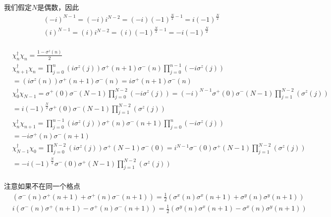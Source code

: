 我们假定$N$是偶数，因此
\begin{equation}
\begin{split}
&(-i)^{N-1} = (-i)i^{N-2} =(-i) (-1)^{\frac{N}{2}-1}=i(-1)^{\frac{N}{2}}\\
&(i)^{N-1} = (i)i^{N-2} =(i) (-1)^{\frac{N}{2}-1}=-i(-1)^{\frac{N}{2}}\\
\end{split}
\end{equation}

\begin{equation}
\begin{split}
&\chi^{\dagger}_n\chi _n = \frac{1-\sigma ^z(n)}{2}\\
&\chi^{\dagger}_{n+1}\chi _n = \prod _{j=0}^n(i\sigma ^z(j)) \sigma ^+(n+1)\sigma ^-(n)\prod _{j=0}^{n-1}(-i\sigma ^z(j))\\
&=(i\sigma ^z(n)) \sigma ^+(n+1)\sigma ^-(n)= i\sigma ^+(n+1)\sigma ^-(n)\\
&\chi^{\dagger}_{0}\chi _{N-1} = \sigma ^+(0)\sigma ^-(N-1)\prod _{j=0}^{N-2}(-i\sigma ^z(j))=(-i)^{N-1}\sigma ^+(0)\sigma ^-(N-1)\prod _{j=1}^{N-2}(\sigma ^z(j))\\
&=i(-1)^{\frac{N}{2}}\sigma ^+(0)\sigma ^-(N-1)\prod _{j=1}^{N-2}(\sigma ^z(j))\\
&\chi^{\dagger}_{n}\chi _{n+1}=\prod _{j=0}^{n-1}(i\sigma ^z(j)) \sigma ^+(n)\sigma ^-(n+1)\prod _{j=0}^{n}(-i\sigma ^z(j))\\
&=-i\sigma ^+(n)\sigma^-(n+1)\\
&\chi^{\dagger}_{N-1}\chi _{0}=\prod _{j=0}^{N-2}(i\sigma ^z(j)) \sigma ^+(N-1)\sigma ^-(0)=i^{N-1}\sigma ^-(0)\sigma ^+(N-1)\prod _{j=1}^{N-2}(\sigma ^z(j))\\
&=-i(-1)^{\frac{N}{2}}\sigma ^-(0)\sigma ^+(N-1)\prod _{j=1}^{N-2}(\sigma ^z(j))\\
\end{split}
\end{equation}

注意如果不在同一个格点
\begin{equation}
\begin{split}
&\left(\sigma ^-(n)\sigma ^+(n+1)+\sigma ^+(n)\sigma ^- (n+1)\right) = \frac{1}{2}\left(\sigma ^x(n)\sigma ^x(n+1)+\sigma ^y(n)\sigma ^y(n+1)\right)\\
&i\left(\sigma ^-(n)\sigma ^+(n+1)-\sigma ^+(n)\sigma ^- (n+1)\right) = \frac{1}{2}\left(\sigma ^y(n)\sigma ^x(n+1)-\sigma ^x(n)\sigma ^y(n+1)\right)\\
\end{split}
\end{equation}

